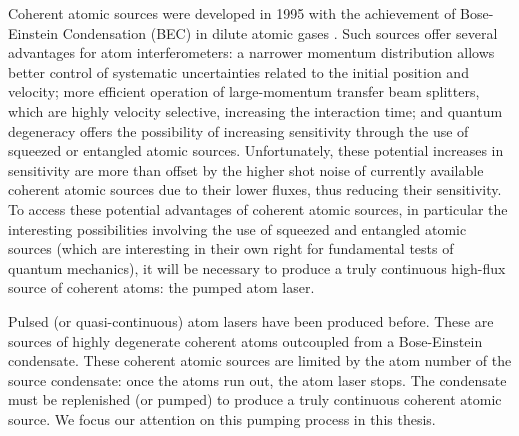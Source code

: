 Coherent atomic sources were developed in 1995 with the achievement of Bose-Einstein Condensation (BEC) in dilute atomic gases \citep{Anderson:1995vn,Bradley:1995ys,Davis:1995}.  Such sources offer several advantages for atom interferometers: a narrower momentum distribution allows better control of systematic uncertainties related to the initial position and velocity; more efficient operation of large-momentum transfer beam splitters, which are highly velocity selective, increasing the interaction time; and quantum degeneracy offers the possibility of increasing sensitivity through the use of squeezed or entangled atomic sources.  Unfortunately, these potential increases in sensitivity are more than offset by the higher shot noise of currently available coherent atomic sources due to their lower fluxes, thus reducing their sensitivity.  To access these potential advantages of coherent atomic sources, in particular the interesting possibilities involving the use of squeezed and entangled atomic sources (which are interesting in their own right for fundamental tests of quantum mechanics), it will be necessary to produce a truly continuous high-flux source of coherent atoms: the pumped atom laser.  

Pulsed (or quasi-continuous) atom lasers have been produced before.  These are sources of highly degenerate coherent atoms outcoupled from a Bose-Einstein condensate.  These coherent atomic sources are limited by the atom number of the source condensate: once the atoms run out, the atom laser stops.  The condensate must be replenished (or pumped) to produce a truly continuous coherent atomic source.  We focus our attention on this pumping process in this thesis.





